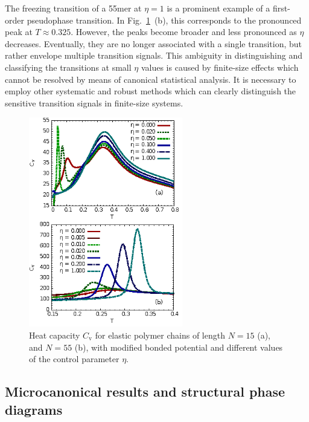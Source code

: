 \documentclass[12pt]{report}
\begin{document}
The freezing transition of a 55mer at $\eta = 1$ is a prominent example of a first-order pseudophase transition. In Fig.~\ref{fig:canonicalAnalysis}~(b), this corresponds to the pronounced peak at $T \approx 0.325$. However, the peaks become broader and less pronounced as $\eta$ decreases. Eventually, they are no longer associated with a single transition, but rather envelope multiple transition signals. This ambiguity in distinguishing and classifying the transitions at small $\eta$ values is caused by finite-size effects which cannot be resolved by means of canonical statistical analysis. It is necessary to employ other systematic and robust methods which can clearly distinguish the sensitive transition signals in finite-size systems.  
%
\begin{figure}
\center
    \includegraphics[width=0.6\textwidth]{chapter6Figs/canonicalAnalysisRough.eps}%
    \caption{\label{fig:canonicalAnalysis}
	Heat capacity $C_{\mathrm{v}}$ for elastic polymer chains of length $N=15$ (a), and $N=55$ (b), with modified bonded potential and different values of the control parameter $\eta$.}
\end{figure}
%

\subsection{Microcanonical results and structural phase diagrams}
\end{document}
